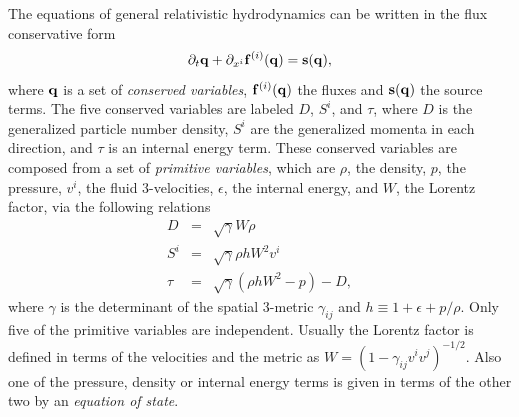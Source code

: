 \documentclass{article}
\begin{document}
The equations of general relativistic hydrodynamics can be written in
the flux conservative form
\begin{equation}
  \label{eq:consform1}
  \partial_t {\bf q} + \partial_{x^i} {\bf f}^{(i)} ({\bf q}) = {\bf
    s} ({\bf q}),
\end{equation}
where ${\bf q}$ is a set of {\it conserved variables}, ${\bf f}^{(i)}
({\bf q})$ the fluxes and ${\bf s} ({\bf q})$ the source
terms.
The five conserved variables are labeled $D$, $S^i$, and $\tau$, where
$D$ is the generalized particle number density, $S^i$ are the generalized
momenta in each direction, and $\tau$ is an internal energy term.
These conserved variables are composed from a set of {\it primitive variables},
which are $\rho$, the density, $p$, the
pressure, $v^i$, the fluid 3-velocities, $\epsilon$, the internal
energy, and $W$, the Lorentz factor, via the following relations
% 
%
\
\begin{eqnarray}
  \label{eq:prim2con}
   D &=& \sqrt{\gamma}W\rho \nonumber \\
   S^i &=& \sqrt{\gamma} \rho h W^2 v^i \nonumber \\
   \tau &=& \sqrt{\gamma}\left( \rho h W^2 - p\right) - D, 
\end{eqnarray}
where $\gamma$ is the determinant of the spatial 3-metric $\gamma_{ij}$ and 
$h \equiv 1 + \epsilon + p/\rho$.
Only five of the primitive variables are
independent. Usually the Lorentz factor is defined in terms of the
velocities and the metric as $W = (1-\gamma_{ij}v^i v^j)^{-1/2}$.  
Also one of the pressure, density or internal energy terms is given in 
terms of the other two by an {\it equation of state}.
\end{document}
